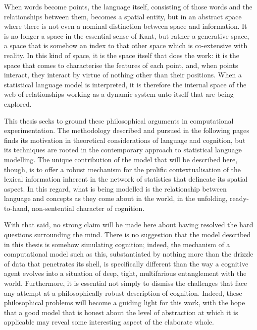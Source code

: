 When words become points, the language itself, consisting of those words and the relationships between them, becomes a spatial entity, but in an abstract space where there is not even a nominal distinction between space and information.  It is no longer a space in the essential sense of Kant, but rather a generative space, a space that is somehow an index to that other space which is co-extensive with reality.  In this kind of space, it is the space itself that does the work: it is the space that comes to characterise the features of each point, and, when points interact, they interact by virtue of nothing other than their positions.  When a statistical language model is interpreted, it is therefore the internal space of the web of relationships working as a dynamic system unto itself that are being explored.

This thesis seeks to ground these philosophical arguments in computational experimentation.  The methodology described and pursued in the following pages finds its motivation in theoretical considerations of language and cognition, but its techniques are rooted in the contemporary approach to statistical language modelling.  The unique contribution of the model that will be described here, though, is to offer a robust mechanism for the prolific contextualisation of the lexical information inherent in the network of statistics that delineate its spatial aspect.  In this regard, what is being modelled is the relationship between language and concepts as they come about in the world, in the unfolding, ready-to-hand, non-sentential character of cognition.

With that said, no strong claim will be made here about having resolved the hard questions surrounding the mind.  There is no suggestion that the model described in this thesis is somehow simulating cognition; indeed, the mechanism of a computational model such as this, substantiated by nothing more than the drizzle of data that penetrates its shell, is specifically different than the way a cognitive agent evolves into a situation of deep, tight, multifarious entanglement with the world.  Furthermore, it is essential not simply to dismiss the challenges that face any attempt at a philosophically robust description of cognition.  Indeed, these philosophical problems will become a guiding light for this work, with the hope that a good model that is honest about the level of abstraction at which it is applicable may reveal some interesting aspect of the elaborate whole.

